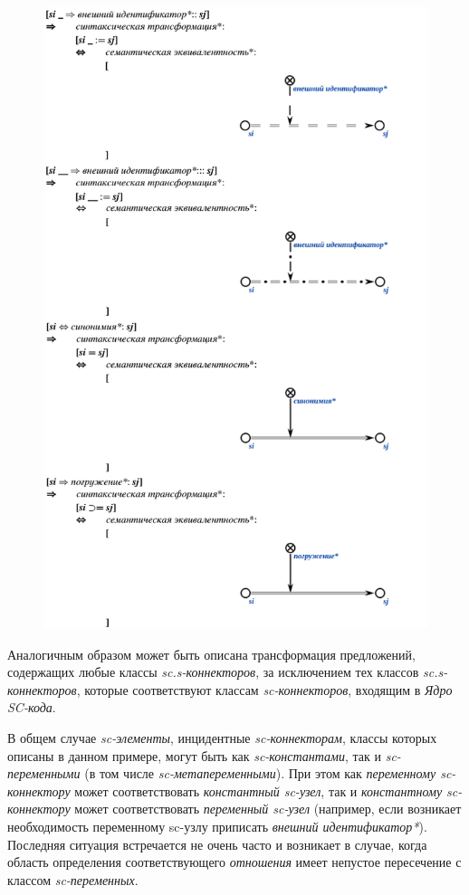 \newpage
\begin{figure}[h]
	\includegraphics[scale=0.5]{images/intro/scs/sc.s-connectors/examples/example_4.png}
\end{figure}

Аналогичным образом может быть описана трансформация предложений, содержащих любые классы \textit{sc.s-коннекторов}, за исключением тех классов \textit{sc.s-коннекторов}, которые соответствуют классам \textit{sc-коннекторов}, входящим в \textit{Ядро SC-кода}.

В общем случае \textit{sc-элементы}, инцидентные \textit{sc-коннекторам}, классы которых описаны в данном примере, могут быть как \textit{sc-константами}, так и \textit{sc-переменными} (в том числе \textit{sc-метапеременными}). При этом как \textit{переменному sc-коннектору} может соответствовать \textit{константный sc-узел}, так и \textit{константному sc-коннектору} может соответствовать \textit{переменный sc-узел} (например, если возникает необходимость переменному sc-узлу приписать \textit{внешний идентификатор*}). Последняя ситуация встречается не очень часто и возникает в случае, когда область определения соответствующего \textit{отношения} имеет непустое пересечение с классом \textit{sc-переменных}.

